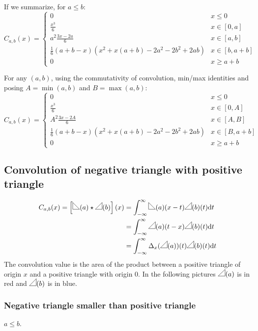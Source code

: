 \documentclass[a4paper,10pt]{article}
\newcommand\Shifted[2]{\Delta_{#1}(#2)}
\newcommand\SymPositiveTriangle{\begin{tikzpicture}%
        \draw (0,0) -- (1em,0em) -- (1em,1em) -- cycle;
\end{tikzpicture}}
\newcommand\PositiveTriangle[1]{\SymPositiveTriangle(#1)}
\newcommand\SymNegativeTriangle{\begin{tikzpicture}%
        \draw (0,0) -- (0,1em) -- (1em,0em) -- cycle;
\end{tikzpicture}}
\newcommand\NegativeTriangle[1]{\SymNegativeTriangle(#1)}
\newcommand\D{\mathrm{d}}
\newcommand\Convolution{\star}
\newcommand\ConvolutionInt[2]{\int_{-\infty}^{\infty}#1 \D#2}
\begin{document}
If we summarize, for $a \le b$:
\[ C_{a,b}(x) = \begin{cases}
    0 & x \le 0 \\
    \frac{x^3}{6} & x \in [0, a] \\
    a^2 \frac{3x-2a}{6} & x \in [a, b] \\
    \frac{1}{6} (a+b-x) (x^2 + x(a+b) -2a^2-2b^2+2ab) & x \in [b, a+b] \\
    0 & x \ge a+b
\end{cases} \]

For any $(a,b)$, using the commutativity of convolution, min/max identities and posing $A=\min(a,b)$ and $B=\max(a,b)$:
\[ C_{a,b}(x) = \begin{cases}
    0 & x \le 0 \\
    \frac{x^3}{6} & x \in [0, A] \\
    A^2 \frac{3x-2A}{6} & x \in [A, B] \\
    \frac{1}{6} (a+b-x) (x^2 + x(a+b) -2a^2-2b^2+2ab) & x \in [B, a+b] \\
    0 & x \ge a+b
\end{cases} \]

\subsection{Convolution of negative triangle with positive triangle}\label{proof_convolution_triangle_neg_pos}
\[ \begin{split}
    C_{a,b}(x) = \left[ \NegativeTriangle{a} \Convolution \PositiveTriangle{b} \right] (x) & = \ConvolutionInt{\NegativeTriangle{a}(x-t) \PositiveTriangle{b}(t)}{t} \\
    & = \ConvolutionInt{\PositiveTriangle{a}(t-x) \PositiveTriangle{b}(t)}{t} \\
    & = \ConvolutionInt{\Shifted{x}{\PositiveTriangle{a}}(t) \PositiveTriangle{b}(t)}{t}
\end{split} \]
The convolution value is the area of the product between a positive triangle of origin $x$ and a positive triangle with origin $0$.
In the following pictures $\PositiveTriangle{a}$ is in red and $\PositiveTriangle{b}$ is in blue.

\subsubsection{Negative triangle smaller than positive triangle}
$a \le b$.
\end{document}

